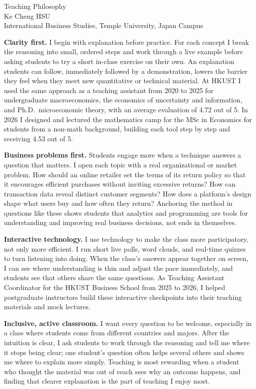\documentclass[11pt]{article}
\begin{document}
\begin{center}
{\Large Teaching Philosophy}\\[0.35em]
Ke Cheng HSU\\
International Business Studies, Temple University, Japan Campus
\end{center}

\noindent\textbf{Clarity first.} I begin with explanation before practice. For each concept I break the reasoning into small, ordered steps and work through a live example before asking students to try a short in-class exercise on their own. An explanation students can follow, immediately followed by a demonstration, lowers the barrier they feel when they meet new quantitative or technical material. At HKUST I used the same approach as a teaching assistant from 2020 to 2025 for undergraduate macroeconomics, the economics of uncertainty and information, and Ph.D.\ microeconomic theory, with an average evaluation of 4.72 out of 5. In 2026 I designed and lectured the mathematics camp for the MSc in Economics for students from a non-math background, building each tool step by step and receiving 4.53 out of 5.

\noindent\textbf{Business problems first.} Students engage more when a technique answers a question that matters. I open each topic with a real organizational or market problem. How should an online retailer set the terms of its return policy so that it encourages efficient purchases without inviting excessive returns? How can transaction data reveal distinct customer segments? How does a platform's design shape what users buy and how often they return? Anchoring the method in questions like these shows students that analytics and programming are tools for understanding and improving real business decisions, not ends in themselves.

\noindent\textbf{Interactive technology.} I use technology to make the class more participatory, not only more efficient. I run short live polls, word clouds, and real-time quizzes to turn listening into doing. When the class's answers appear together on screen, I can see where understanding is thin and adjust the pace immediately, and students see that others share the same questions. As Teaching Assistant Coordinator for the HKUST Business School from 2025 to 2026, I helped postgraduate instructors build these interactive checkpoints into their teaching materials and mock lectures.

\noindent\textbf{Inclusive, active classroom.} I want every question to be welcome, especially in a class where students come from different countries and majors. After the intuition is clear, I ask students to work through the reasoning and tell me where it stops being clear; one student's question often helps several others and shows me where to explain more simply. Teaching is most rewarding when a student who thought the material was out of reach sees why an outcome happens, and finding that clearer explanation is the part of teaching I enjoy most.
\end{document}
